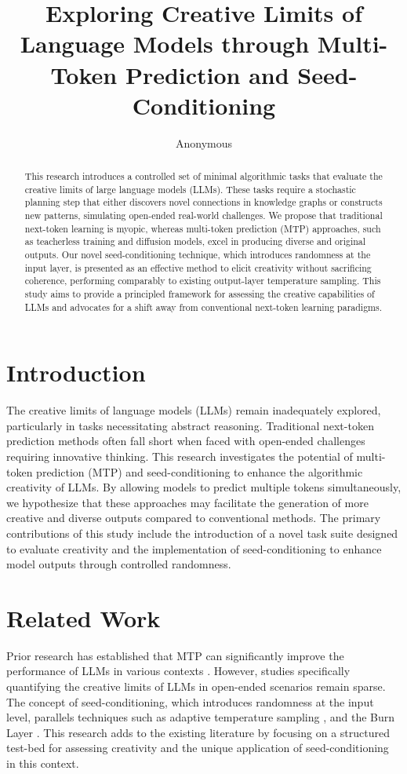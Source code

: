 \documentclass{article} %
\title{
Exploring Creative Limits of Language Models through Multi-Token Prediction and Seed-Conditioning
}
\author{Anonymous}
\theoremstyle{plain}
\theoremstyle{definition}
\theoremstyle{remark}
\begin{document}
\maketitle

\begin{abstract}
This research introduces a controlled set of minimal algorithmic tasks that evaluate the creative limits of large language models (LLMs). These tasks require a stochastic planning step that either discovers novel connections in knowledge graphs or constructs new patterns, simulating open-ended real-world challenges. We propose that traditional next-token learning is myopic, whereas multi-token prediction (MTP) approaches, such as teacherless training and diffusion models, excel in producing diverse and original outputs. Our novel seed-conditioning technique, which introduces randomness at the input layer, is presented as an effective method to elicit creativity without sacrificing coherence, performing comparably to existing output-layer temperature sampling. This study aims to provide a principled framework for assessing the creative capabilities of LLMs and advocates for a shift away from conventional next-token learning paradigms.
\end{abstract}

\section{Introduction}
\label{sec:intro}
The creative limits of language models (LLMs) remain inadequately explored, particularly in tasks necessitating abstract reasoning. Traditional next-token prediction methods often fall short when faced with open-ended challenges requiring innovative thinking. This research investigates the potential of multi-token prediction (MTP) and seed-conditioning to enhance the algorithmic creativity of LLMs. By allowing models to predict multiple tokens simultaneously, we hypothesize that these approaches may facilitate the generation of more creative and diverse outputs compared to conventional methods. The primary contributions of this study include the introduction of a novel task suite designed to evaluate creativity and the implementation of seed-conditioning to enhance model outputs through controlled randomness.

\section{Related Work}
\label{sec:related}
Prior research has established that MTP can significantly improve the performance of LLMs in various contexts \cite{kalinsky2023simpleae, walker2024futuretp}. However, studies specifically quantifying the creative limits of LLMs in open-ended scenarios remain sparse. The concept of seed-conditioning, which introduces randomness at the input level, parallels techniques such as adaptive temperature sampling \cite{zhu2023hotoc}, and the Burn Layer \cite{hassan2024optimizingpa}. This research adds to the existing literature by focusing on a structured test-bed for assessing creativity and the unique application of seed-conditioning in this context.
\end{document}

